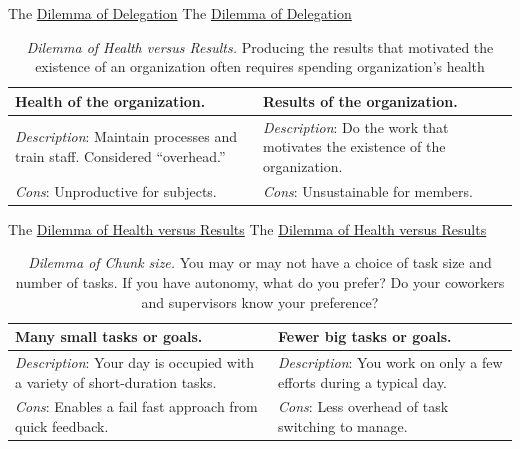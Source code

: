 The \href{table:delegate-or-not}{Dilemma of Delegation}
The \href{table:delegate-or-not}{Dilemma of Delegation}


\begin{center}
\begin{table}[H] %
\begin{tabular}{ | m{\dilemmatablewidth}| m{\dilemmatablewidth} | } 
  \hline
  \textbf{Health of the organization.} & 
  \textbf{Results of the organization.} \\ 
  \hline
  \textit{Description}: Maintain processes and train staff. Considered ``overhead.'' & 
  \textit{Description}: Do the work that motivates the existence of the organization. \\  
    \hline
  \textit{Cons}: Unproductive for subjects. & 
  \textit{Cons}: Unsustainable for members. \\
  \hline
\end{tabular}
\caption{
\textit{Dilemma of Health versus Results.}
 Producing the results that motivated the existence of an organization often requires spending organization's health
}
\label{table:health-vs-results}
\end{table}
\end{center}

The \href{table:health-vs-results}{Dilemma of Health versus Results}
The \href{table:health-vs-results}{Dilemma of Health versus Results}

\begin{center}
\begin{table}[H] %
\begin{tabular}{ | m{\dilemmatablewidth}| m{\dilemmatablewidth} | } 
  \hline
  \textbf{Many small tasks or goals.} & 
  \textbf{Fewer big tasks or goals.} \\ 
  \hline
  \textit{Description}: Your day is occupied with a variety of short-duration tasks. & 
  \textit{Description}: You work on only a few efforts during a typical day. \\  
    \hline
  \textit{Cons}: Enables a fail fast approach from quick feedback. & 
  \textit{Cons}: Less overhead of task switching to manage. \\
  \hline
\end{tabular}
\caption{
\textit{Dilemma of Chunk size.}
You may or may not have a choice of task size and number of tasks. If you have autonomy, what do you prefer? Do your coworkers and supervisors know your preference? 
}
\label{table:chunk_size}
\end{table}
\end{center}


